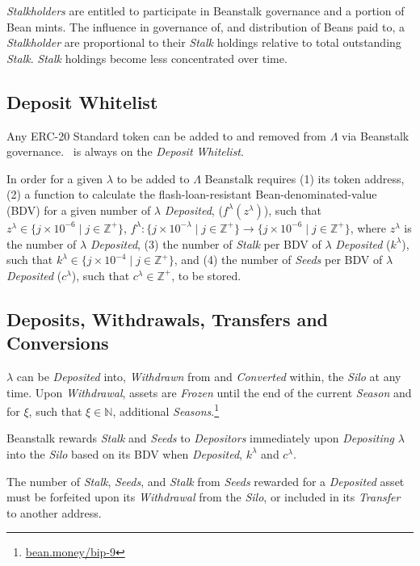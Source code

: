 \documentclass[tikz]{article}
\newcommand{\term}[1]{\textsl{#1}}
\newcommand{\Bean}{} %
\begin{document}
\term{Stalkholders} are entitled to participate in Beanstalk governance and a portion of Bean mints. The influence in governance of, and distribution of Beans paid to, a \term{Stalkholder} are proportional to their \term{Stalk} holdings relative to total outstanding \term{Stalk}. \term{Stalk} holdings become less concentrated over time.

\subsection{Deposit Whitelist}
Any ERC-20 Standard token can be added to and removed from $\Lambda$ via Beanstalk governance. \Bean\ is always on the \term{Deposit} \term{Whitelist}.

\newpage
In order for a given $\lambda$ to be added to $\Lambda$ Beanstalk requires (1) its token address, (2) a function to calculate the flash-loan-resistant Bean-denominated-value (BDV) for a given number of $\lambda$ \term{Deposited}, ($f^{\lambda}(z^{\lambda})$), such that $z^{\lambda} \in \{j \times 10^{-6} \mid j \in \mathbb{Z}^{+} \}$, $f^{\lambda}\colon \{j \times 10^{-\lambda} \mid j \in \mathbb{Z}^{+} \} \rightarrow \{j \times 10^{-6} \mid j \in \mathbb{Z}^{+} \}$, where $z^{\lambda}$ is the number of $\lambda$ \term{Deposited}, (3) the number of \term{Stalk} per BDV of $\lambda$ \term{Deposited} ($k^{\lambda}$), such that $k^{\lambda} \in \{j \times 10^{-4} \mid j \in \mathbb{Z}^{+} \}$, and (4) the number of \term{Seeds} per BDV of $\lambda$ \term{Deposited} ($c^{\lambda}$), such that $c^{\lambda} \in \mathbb{Z}^{+}$, to be stored.

\subsection{Deposits, Withdrawals, Transfers and Conversions}
$\lambda$ can be \term{Deposited} into, \term{Withdrawn} from and \term{Converted} within, the \term{Silo} at any time. Upon \term{Withdrawal}, assets are \term{Frozen} until the end of the current \term{Season} and for $\xi$, such that $\xi \in \mathbb{N}$, additional \term{Seasons}.\footnote{\href{https://bean.money/bip-9}{bean.money/bip-9}}

Beanstalk rewards \term{Stalk} and \term{Seeds} to \term{Depositors} immediately upon \term{Depositing} $\lambda$ into the \term{Silo} based on its BDV when \term{Deposited}, $k^{\lambda}$ and $c^{\lambda}$.

The number of \term{Stalk}, \term{Seeds}, and \term{Stalk} from \term{Seeds} rewarded for a \term{Deposited} asset must be forfeited upon its \term{Withdrawal} from the \term{Silo}, or included in its \term{Transfer} to another address. 
\end{document}
